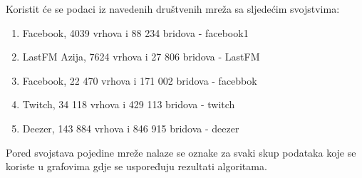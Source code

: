Koristit će se podaci iz navedenih društvenih mreža sa sljedećim svojstvima:
\begin{enumerate}
	\item Facebook, 4039 vrhova i 88 234 bridova - facebook1
	\item LastFM Azija, 7624 vrhova i 27 806 bridova - LastFM
	\item Facebook, 22 470 vrhova i 171 002 bridova - facebbok
	\item Twitch, 34 118 vrhova i 429 113 bridova - twitch
	\item Deezer, 143 884 vrhova i 846 915 bridova - deezer
\end{enumerate}
Pored svojstava pojedine mreže nalaze se oznake za svaki skup podataka koje se koriste u grafovima gdje se uspoređuju rezultati algoritama.
